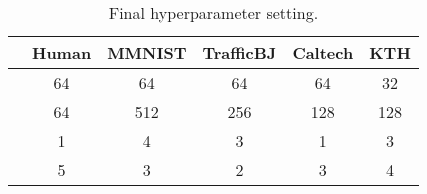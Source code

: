 \documentclass[10pt,twocolumn,letterpaper]{article}
\begin{document}
\begin{table}[h]
  \centering
  \begin{tabular}{cccccc}
    \toprule
          & Human & MMNIST & TrafficBJ & Caltech & KTH \\
  \midrule
    & 64    & 64     & 64        & 64      & 32  \\
   & 64    & 512    & 256       & 128     & 128 \\
        & 1     & 4      & 3         & 1       & 3   \\
        & 5     & 3      & 2         & 3       & 4  \\
  \bottomrule
  \end{tabular}
  \caption{Final hyperparameter setting.}
  \label{tab:hyper_param}
\end{table}













 
\end{document}
